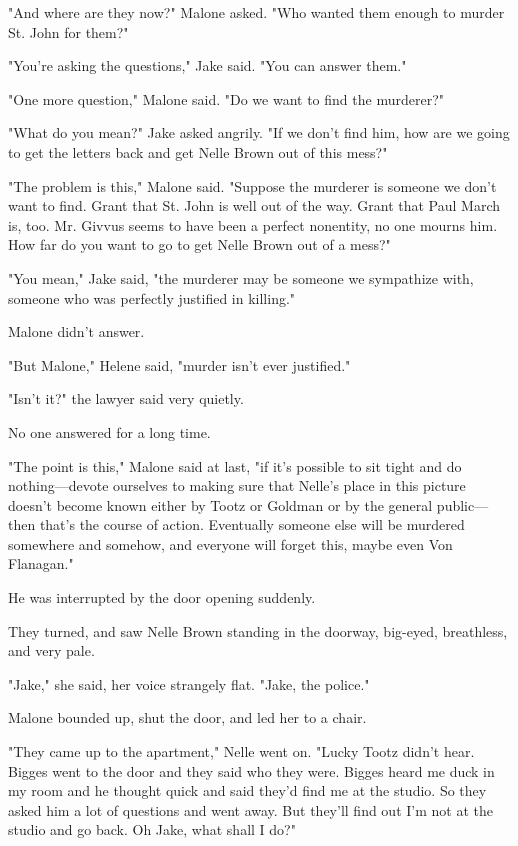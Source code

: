 \documentclass{novel}
\begin{document}
"And where are they now?" Malone asked. "Who wanted them enough to murder St. John for them?"

"You’re asking the questions," Jake said. "You can answer them."

"One more question," Malone said. "Do we want to find the murderer?"

"What do you mean?" Jake asked angrily. "If we don’t find him, how are we going to get the letters back and get Nelle Brown out of this mess?"

"The problem is this," Malone said. "Suppose the murderer is someone we don’t want to find. Grant that St. John is well out of the way. Grant that Paul March is, too. Mr. Givvus seems to have been a perfect nonentity, no one mourns him. How far do you want to go to get Nelle Brown out of a mess?"

"You mean," Jake said, "the murderer may be someone we sympathize with, someone who was perfectly justified in killing."

Malone didn’t answer.

"But Malone," Helene said, "murder isn’t ever justified."

"Isn’t it?" the lawyer said very quietly.

No one answered for a long time.

"The point is this," Malone said at last, "if it’s possible to sit tight and do nothing—devote ourselves to making sure that Nelle’s place in this picture doesn’t become known either by Tootz or Goldman or by the general public—then that’s the course of action. Eventually someone else will be murdered somewhere and somehow, and everyone will forget this, maybe even Von Flanagan."

He was interrupted by the door opening suddenly.

They turned, and saw Nelle Brown standing in the doorway, big-eyed, breathless, and very pale.

"Jake," she said, her voice strangely flat. "Jake, the police."

Malone bounded up, shut the door, and led her to a chair.

"They came up to the apartment," Nelle went on. "Lucky Tootz didn’t hear. Bigges went to the door and they said who they were. Bigges heard me duck in my room and he thought quick and said they’d find me at the studio. So they asked him a lot of questions and went away. But they’ll find out I’m not at the studio and go back. Oh Jake, what shall I do?"
\end{document}
